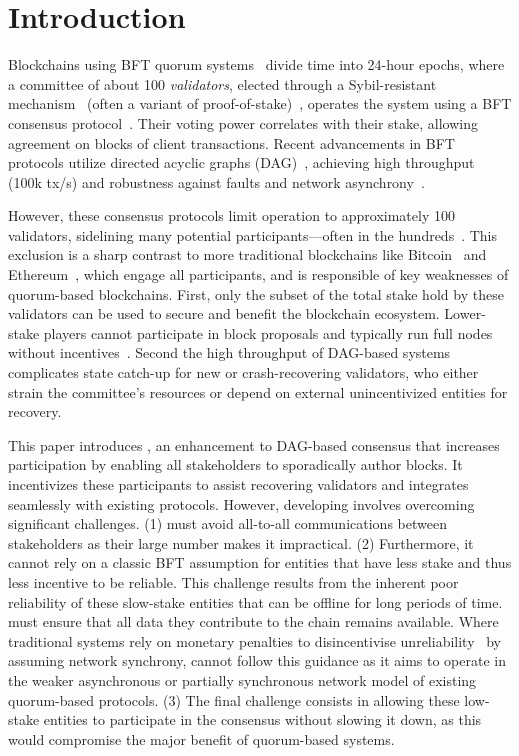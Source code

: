 \section{Introduction}

Blockchains using BFT quorum systems~\cite{sui,aptos,solana} divide time into 24-hour epochs, where a committee of about 100 \emph{validators}, elected through a Sybil-resistant mechanism~\cite{douceur2002sybil} (often a variant of proof-of-stake)~\cite{kucci2021proof}, operates the system using a BFT consensus protocol~\cite{pbft,jolteon,mysticeti}. Their voting power correlates with their stake, allowing agreement on blocks of client transactions. Recent advancements in BFT protocols utilize directed acyclic graphs (DAG)~\cite{narwhal,bullshark,shoal++,mysticeti,sailfish,bbca-chain,gradeddag,cordial-miners}, achieving high throughput (100k tx/s) and robustness against faults and network asynchrony~\cite{consensus-dos,narwhal}.

However, these consensus protocols limit operation to approximately 100 validators, sidelining many potential participants---often in the hundreds~\cite{sui-scan}. This exclusion is a sharp contrast to more traditional blockchains like Bitcoin~\cite{bitcoin} and Ethereum~\cite{ethereum}, which engage all participants, and is responsible of key weaknesses of quorum-based blockchains.
First, only the subset of the total stake hold by these validators can be used to secure and benefit the blockchain ecosystem. Lower-stake players cannot participate in block proposals and typically run full nodes without incentives~\cite{krol2024disc}.
Second the high throughput of DAG-based systems complicates state catch-up for new or crash-recovering validators, who either strain the committee's resources or depend on external unincentivized entities for recovery.

This paper introduces \sysname, an enhancement to DAG-based consensus that increases participation by enabling all stakeholders to sporadically author blocks. It incentivizes these participants to assist recovering validators and integrates seamlessly with existing protocols. However, developing \sysname involves overcoming significant challenges.
(1) \sysname must avoid all-to-all communications between stakeholders as their large number makes it impractical.
(2) Furthermore, it cannot rely on a classic BFT assumption for entities that have less stake and thus less incentive to be reliable. This challenge results from the inherent poor reliability of these slow-stake entities that can be offline for long periods of time. \sysname must ensure that all data they contribute to the chain remains available. Where traditional systems rely on monetary penalties to disincentivise unreliability~\cite{he2023don} by assuming network synchrony, \sysname cannot follow this guidance as it aims to operate in the weaker asynchronous or partially synchronous network model of existing quorum-based protocols.
(3) The final challenge consists in allowing these low-stake entities to participate in the consensus without slowing it down, as this would compromise the major benefit of quorum-based systems.

